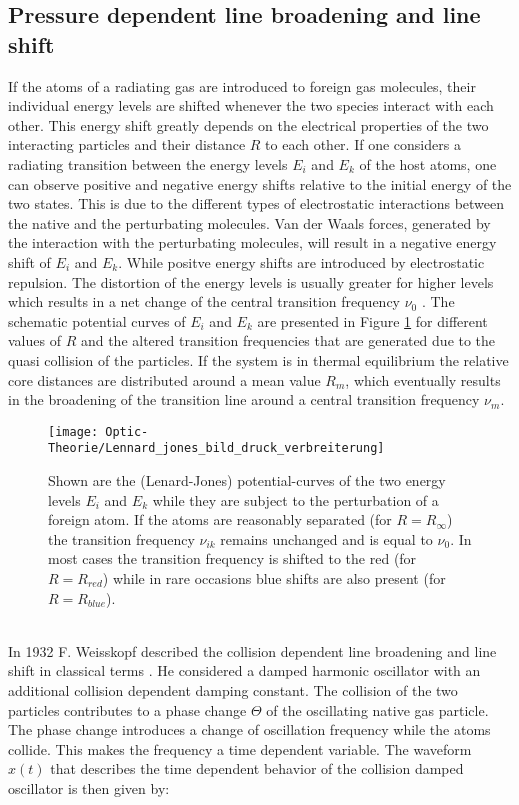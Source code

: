 \subsection{Pressure dependent line broadening and line shift}
\noindent
If the atoms  of a radiating gas are introduced to foreign gas molecules, their individual energy levels are shifted whenever the two species interact with each other. This energy shift greatly depends on the electrical properties of the two interacting particles and their distance $R$ to each other. If one considers a radiating transition between the energy levels $E_i$ and $E_k$ of the host atoms, one can observe positive and negative energy shifts relative to the initial energy of the two states. This is due to the different types of electrostatic interactions between the native and the perturbating molecules. Van der Waals forces, generated by the interaction with the perturbating molecules, will result in a negative energy shift of $E_i$ and $E_k$. While positve energy shifts are introduced by electrostatic repulsion. The distortion of the energy levels is usually greater for higher levels which results in a net change of the central transition frequency $\nu_0$ \cite{Margenau1936}. 
The schematic potential curves of $E_i$ and $E_k$ are presented in Figure \ref{figure:lennard_jones_bild_druck_verbreiterung} for different values of $R$ and the altered transition frequencies that are generated due to the quasi collision of the particles. If the system is in thermal equilibrium the relative core distances are distributed around a mean value $R_m$, which eventually results in the broadening of the transition line around a central transition frequency $\nu_m$. \\
\begin{figure}[ht]
	\centering
	\texttt{[image: Optic-Theorie/Lennard\_jones\_bild\_druck\_verbreiterung]}
	\caption{Shown are the (Lenard-Jones) potential-curves of the two energy levels $E_i$ and $E_k$ while they are subject to the perturbation of a foreign atom. If the atoms are reasonably separated (for $R=R_\infty$) the transition frequency $\nu_{ik}$ remains unchanged and is equal to $\nu_0$. In most cases the transition frequency is shifted to the red (for $R=R_{red}$) while in rare occasions blue shifts are also present (for $R=R_{blue}$).}
	\label{figure:lennard_jones_bild_druck_verbreiterung}
\end{figure}\\ 
In 1932 F. Weisskopf described the collision dependent line broadening and line shift in classical terms \cite{Weisskopf1932}. He considered a damped harmonic oscillator with an additional collision dependent damping constant. The collision of the two particles contributes to a phase change $\Theta$ of the oscillating native gas particle. The phase change introduces a change of oscillation frequency while the atoms collide. This makes the frequency a time dependent variable. The waveform $x(t)$ that describes the time dependent behavior of the collision damped oscillator is then given by:
